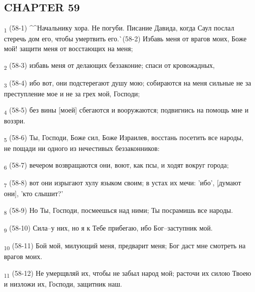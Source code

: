 \subsection{CHAPTER 59}
\begin{tcolorbox}
\textsubscript{1} (58-1) ^^Начальнику хора. Не погуби. Писание Давида, когда Саул послал стеречь дом его, чтобы умертвить его.^^ (58-2) Избавь меня от врагов моих, Боже мой! защити меня от восстающих на меня;
\end{tcolorbox}
\begin{tcolorbox}
\textsubscript{2} (58-3) избавь меня от делающих беззаконие; спаси от кровожадных,
\end{tcolorbox}
\begin{tcolorbox}
\textsubscript{3} (58-4) ибо вот, они подстерегают душу мою; собираются на меня сильные не за преступление мое и не за грех мой, Господи;
\end{tcolorbox}
\begin{tcolorbox}
\textsubscript{4} (58-5) без вины [моей] сбегаются и вооружаются; подвигнись на помощь мне и воззри.
\end{tcolorbox}
\begin{tcolorbox}
\textsubscript{5} (58-6) Ты, Господи, Боже сил, Боже Израилев, восстань посетить все народы, не пощади ни одного из нечестивых беззаконников:
\end{tcolorbox}
\begin{tcolorbox}
\textsubscript{6} (58-7) вечером возвращаются они, воют, как псы, и ходят вокруг города;
\end{tcolorbox}
\begin{tcolorbox}
\textsubscript{7} (58-8) вот они изрыгают хулу языком своим; в устах их мечи: 'ибо', [думают они], 'кто слышит?'
\end{tcolorbox}
\begin{tcolorbox}
\textsubscript{8} (58-9) Но Ты, Господи, посмеешься над ними; Ты посрамишь все народы.
\end{tcolorbox}
\begin{tcolorbox}
\textsubscript{9} (58-10) Сила--у них, но я к Тебе прибегаю, ибо Бог--заступник мой.
\end{tcolorbox}
\begin{tcolorbox}
\textsubscript{10} (58-11) Бой мой, милующий меня, предварит меня; Бог даст мне смотреть на врагов моих.
\end{tcolorbox}
\begin{tcolorbox}
\textsubscript{11} (58-12) Не умерщвляй их, чтобы не забыл народ мой; расточи их силою Твоею и низложи их, Господи, защитник наш.
\end{tcolorbox}
